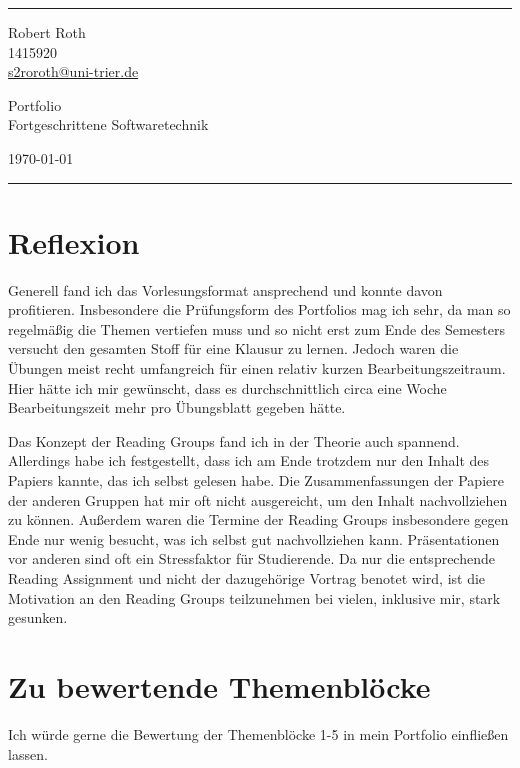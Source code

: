 \documentclass[a4paper]{article}
\begin{document}

\fancyhead[C]{}
\hrule \medskip %
\begin{minipage}{0.295\textwidth} 
\raggedright
\footnotesize
Robert Roth \hfill\\   
1415920\hfill\\
\href{mailto:s2roroth@uni-trier.de}{s2roroth@uni-trier.de} 
\end{minipage}
\begin{minipage}{0.4\textwidth} 
\centering 
\large 
Portfolio\\ 
\normalsize 
Fortgeschrittene Softwaretechnik\\ 
\end{minipage}
\begin{minipage}{0.295\textwidth} 
\raggedleft
\today\hfill\\
\end{minipage}
\medskip\hrule 
\bigskip


\section{Reflexion}
Generell fand ich das Vorlesungsformat ansprechend und konnte davon profitieren. Insbesondere die Prüfungsform des Portfolios mag ich sehr, da man so regelmäßig die Themen vertiefen muss und so nicht erst zum Ende des Semesters versucht den gesamten Stoff für eine Klausur zu lernen. Jedoch waren die Übungen meist recht umfangreich für einen relativ kurzen Bearbeitungszeitraum. Hier hätte ich mir gewünscht, dass es durchschnittlich circa eine Woche Bearbeitungszeit mehr pro Übungsblatt gegeben hätte. 

Das Konzept der Reading Groups fand ich in der Theorie auch spannend. Allerdings habe ich festgestellt, dass ich am Ende trotzdem nur den Inhalt des Papiers kannte, das ich selbst gelesen habe. Die Zusammenfassungen der Papiere der anderen Gruppen hat mir oft nicht ausgereicht, um den Inhalt nachvollziehen zu können. Außerdem waren die Termine der Reading Groups insbesondere gegen Ende nur wenig besucht, was ich selbst gut nachvollziehen kann. Präsentationen vor anderen sind oft ein Stressfaktor für Studierende. Da nur die entsprechende Reading Assignment und nicht der dazugehörige Vortrag benotet wird, ist die Motivation an den Reading Groups teilzunehmen bei vielen, inklusive mir, stark gesunken.

\section{Zu bewertende Themenblöcke}
Ich würde gerne die Bewertung der Themenblöcke 1-5 in mein Portfolio einfließen lassen.
\end{document}
